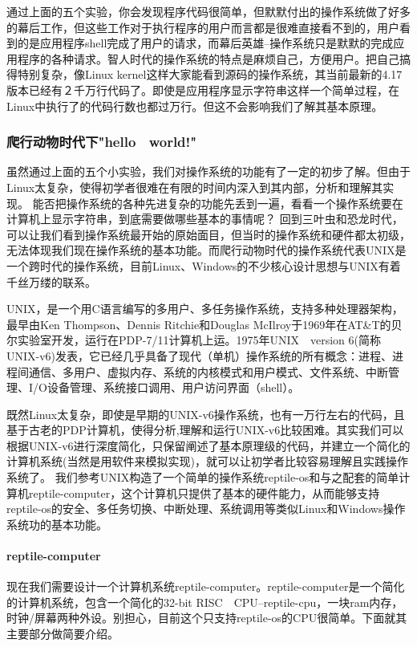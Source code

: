 通过上面的五个实验，你会发现程序代码很简单，但默默付出的操作系统做了好多的幕后工作，但这些工作对于执行程序的用户而言都是很难直接看不到的，用户看到的是应用程序shell完成了用户的请求，而幕后英雄--操作系统只是默默的完成应用程序的各种请求。智人时代的操作系统的特点是麻烦自己，方便用户。把自己搞得特别复杂，像Linux kernel这样大家能看到源码的操作系统，其当前最新的4.17版本已经有２千万行代码了。即使是应用程序显示字符串这样一个简单过程，在Linux中执行了的代码行数也都过万行。但这不会影响我们了解其基本原理。

\subsubsection{爬行动物时代下"hello　world!"}

虽然通过上面的五个小实验，我们对操作系统的功能有了一定的初步了解。但由于Linux太复杂，使得初学者很难在有限的时间内深入到其内部，分析和理解其实现。
能否把操作系统的各种先进复杂的功能先丢到一遍，看看一个操作系统要在计算机上显示字符串，到底需要做哪些基本的事情呢？
回到三叶虫和恐龙时代，可以让我们看到操作系统最开始的原始面目，但当时的操作系统和硬件都太初级，无法体现我们现在操作系统的基本功能。而爬行动物时代的操作系统代表UNIX是一个跨时代的操作系统，目前Linux、Windows的不少核心设计思想与UNIX有着千丝万缕的联系。

\begin{note} 
UNIX，是一个用C语言编写的多用户、多任务操作系统，支持多种处理器架构，最早由Ken Thompson、Dennis Ritchie和Douglas McIlroy于1969年在AT\&T的贝尔实验室开发，运行在PDP-7/11计算机上运。1975年UNIX　version 6(简称UNIX-v6)发表，它已经几乎具备了现代（单机）操作系统的所有概念：进程、进程间通信、多用户、虚拟内存、系统的内核模式和用户模式、文件系统、中断管理、I/O设备管理、系统接口调用、用户访问界面（shell）。
\end{note} 
	
既然Linux太复杂，即使是早期的UNIX-v6操作系统，也有一万行左右的代码，且基于古老的PDP计算机，使得分析,理解和运行UNIX-v6比较困难。其实我们可以根据UNIX-v6进行深度简化，只保留阐述了基本原理级的代码，并建立一个简化的计算机系统(当然是用软件来模拟实现)，就可以让初学者比较容易理解且实践操作系统了。
我们参考UNIX构造了一个简单的操作系统reptile-os和与之配套的简单计算机reptile-computer，这个计算机只提供了基本的硬件能力，从而能够支持reptile-os的安全、多任务切换、中断处理、系统调用等类似Linux和Windows操作系统功的基本功能。

\paragraph{reptile-computer}
现在我们需要设计一个计算机系统reptile-computer。reptile-computer是一个简化的计算机系统，包含一个简化的32-bit RISC　CPU--reptile-cpu，一块ram内存，时钟/屏幕两种外设。别担心，目前这个只支持reptile-os的CPU很简单。下面就其主要部分做简要介绍。

